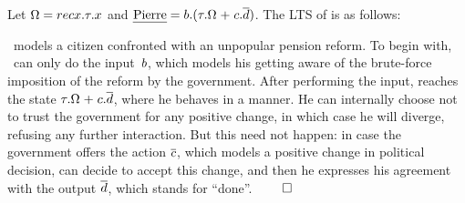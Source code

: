\begin{example}
\label{ex:pierre}
Let $\Omega = \rec{\tau. x}$ and $\text{{\em Pierre}} = b.(\tau.\Omega \mathrel{+} c.\overline{d}) $.
The LTS of \pierre is as follows:
\begin{center}
  \end{center}
\pierre\ models a 
citizen confronted with an unpopular pension reform. To begin with, \pierre\ can only do
the input~$b$, which models %
his getting aware of the brute-force imposition of the
reform by the government.
After performing the input, \pierre reaches the state
$ \tau.\Omega \mathrel{+} c.\overline{d} $, where he behaves in a \nondeterministic
manner. He can internally choose not to trust the government for
  any positive change, in which case he will diverge, refusing any
  further interaction.  But this need not happen: in case the
   government offers
  the action $\overline{c}$, which models a positive change in political
  decision, \pierre can decide to accept this change, and then
  he expresses his agreement with the output $\overline{d}$,
  which stands for ``done''.
 \hfill$\qed$
\end{example}



